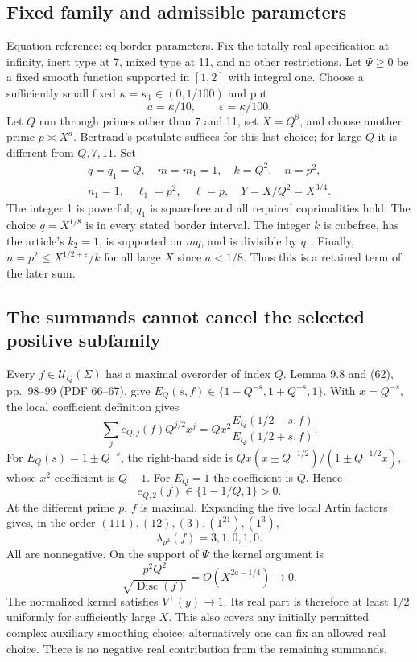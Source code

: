 \documentclass[10pt]{article}
\begin{document}
\subsection*{Fixed family and admissible parameters}
Equation reference: eq:border-parameters. Fix the totally real specification at infinity, inert type at 7, mixed type at 11, and no other restrictions. Let \(\Psi\ge0\) be a fixed smooth function supported in \([1,2]\) with integral one. Choose a sufficiently small fixed \(\kappa=\kappa_1\in(0,1/100)\) and put \[a=\kappa/10,\qquad \varepsilon=\kappa/100.\] Let \(Q\) run through primes other than 7 and 11, set \(X=Q^8\), and choose another prime \(p\asymp X^a\). Bertrand’s postulate suffices for this last choice; for large \(Q\) it is different from \(Q,7,11\). Set \[
\begin{aligned}
 q=q_1=Q,\quad m=m_1=1,\quad k=Q^2,\quad n=p^2,\\
 n_1=1,\quad\ell_1=p^2,\quad\ell=p,\quad Y=X/Q^2=X^{3/4}.
\end{aligned}\] The integer 1 is powerful; \(q_1\) is squarefree and all required coprimalities hold. The choice \(q=X^{1/8}\) is in every stated border interval. The integer \(k\) is cubefree, has the article’s \(k_2=1\), is supported on \(mq\), and is divisible by \(q_1\). Finally, \(n=p^2\le X^{1/2+\varepsilon}/k\) for all large \(X\) since \(a<1/8\). Thus this is a retained term of the later sum.\par
\subsection*{The summands cannot cancel the selected positive subfamily}
Every \(f\in\mathcal U_Q(\Sigma)\) has a maximal overorder of index \(Q\). Lemma 9.8 and (62), pp. 98–99 (PDF 66–67), give \(E_Q(s,f)\in\{1-Q^{-s},1+Q^{-s},1\}\). With \(x=Q^{-s}\), the local coefficient definition gives \[\sum_j e_{Q,j}(f)Q^{j/2}x^j
 =Qx^2\frac{E_Q(1/2-s,f)}{E_Q(1/2+s,f)}.\] For \(E_Q(s)=1\pm Q^{-s}\), the right-hand side is \(Qx(x\pm Q^{-1/2})/(1\pm Q^{-1/2}x)\), whose \(x^2\) coefficient is \(Q-1\). For \(E_Q=1\) the coefficient is \(Q\). Hence \[e_{Q,2}(f)\in\{1-1/Q,1\}>0.\] At the different prime \(p\), \(f\) is maximal. Expanding the five local Artin factors gives, in the order \((111),(12),(3),(1^21),(1^3)\), \[\lambda_{p^2}(f)=3,1,0,1,0.\] All are nonnegative. On the support of \(\Psi\) the kernel argument is \[\frac{p^2Q^2}{\sqrt{\operatorname{Disc}(f)}}=O(X^{2a-1/4})\longrightarrow0.\] The normalized kernel satisfies \(V^+(y)\to1\). Its real part is therefore at least \(1/2\) uniformly for sufficiently large \(X\). This also covers any initially permitted complex auxiliary smoothing choice; alternatively one can fix an allowed real choice. There is no negative real contribution from the remaining summands.\par
\end{document}
